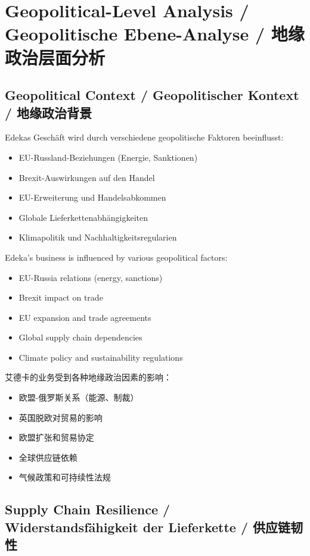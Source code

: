 \chapter{Geopolitical-Level Analysis / Geopolitische Ebene-Analyse / 地缘政治层面分析}

\section{Geopolitical Context / Geopolitischer Kontext / 地缘政治背景}

\begin{otherlanguage}{ngerman}
Edekas Geschäft wird durch verschiedene geopolitische Faktoren beeinflusst:
\begin{itemize}
    \item EU-Russland-Beziehungen (Energie, Sanktionen)
    \item Brexit-Auswirkungen auf den Handel
    \item EU-Erweiterung und Handelsabkommen
    \item Globale Lieferkettenabhängigkeiten
    \item Klimapolitik und Nachhaltigkeitsregularien
\end{itemize}
\end{otherlanguage}

Edeka's business is influenced by various geopolitical factors:
\begin{itemize}
    \item EU-Russia relations (energy, sanctions)
    \item Brexit impact on trade
    \item EU expansion and trade agreements
    \item Global supply chain dependencies
    \item Climate policy and sustainability regulations
\end{itemize}

艾德卡的业务受到各种地缘政治因素的影响：
\begin{itemize}
    \item 欧盟-俄罗斯关系（能源、制裁）
    \item 英国脱欧对贸易的影响
    \item 欧盟扩张和贸易协定
    \item 全球供应链依赖
    \item 气候政策和可持续性法规
\end{itemize}

\section{Supply Chain Resilience / Widerstandsfähigkeit der Lieferkette / 供应链韧性}


